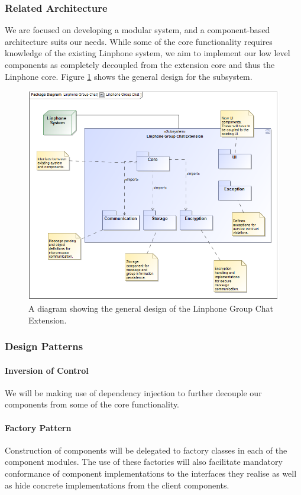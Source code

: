 \documentclass[11pt]{article}
\begin{document}
\subsubsection{Related Architecture}
We are focused on developing a modular system, and a component-based architecture suits our needs. While some of the core functionality requires knowledge of the existing Linphone system, we aim to implement our low level components as completely decoupled from the extension core and thus the Linphone core. Figure \ref{figure-architecture} shows the general design for the subsystem.
\begin{figure}[H]
\centering
\includegraphics[width=5in]{./images/architecture.png}
\caption[Architecture UML]{A diagram showing the general design of the Linphone Group Chat Extension.}
\label{figure-architecture}
\end{figure}

\subsubsection{Design Patterns}
\paragraph{Inversion of Control}
We will be making use of dependency injection to further decouple our components from some of the core functionality. 
\paragraph{Factory Pattern}
Construction of components will be delegated to factory classes in each of the component modules. The use of these factories will also facilitate mandatory conformance of component implementations to the interfaces they realise as well as hide concrete implementations from the client components.
\end{document}
